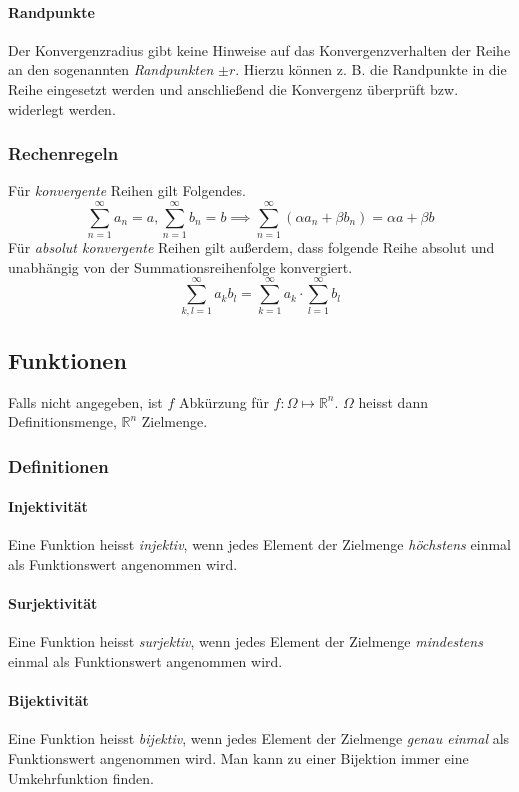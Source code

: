 \documentclass[a4paper, 9pt, DIV=24]{scrartcl}
\newcommand{\R}{\mathbb{R}}
\begin{document}
\paragraph{Randpunkte}
Der Konvergenzradius gibt keine Hinweise auf das Konvergenzverhalten der Reihe an den sogenannten \emph{Randpunkten} $\pm r$.
Hierzu können z. B. die Randpunkte in die Reihe eingesetzt werden und anschließend die Konvergenz überprüft bzw. widerlegt werden.

\subsubsection{Rechenregeln}
Für \emph{konvergente} Reihen gilt Folgendes.
\[
  \sum_{n=1}^\infty a_n = a, \sum_{n=1}^\infty b_n = b \implies
  \sum_{n=1}^\infty (\alpha a_n + \beta b_n) = \alpha a + \beta b
\]
Für \emph{absolut konvergente} Reihen gilt außerdem, dass folgende Reihe absolut und unabhängig von der Summationsreihenfolge konvergiert.
\[
  \sum_{k,l=1}^\infty a_k b_l = \sum_{k=1}^\infty a_k \cdot \sum_{l=1}^\infty b_l
\]

\subsection{Funktionen}
Falls nicht angegeben, ist $f$ Abkürzung für $f: \Omega \mapsto \R^n$. $\Omega$ heisst dann Definitionsmenge, $\R^n$ Zielmenge.
\subsubsection{Definitionen}
\paragraph{Injektivität}
Eine Funktion heisst \emph{injektiv}, wenn jedes Element der Zielmenge \emph{höchstens} einmal als Funktionswert angenommen wird.
\paragraph{Surjektivität}
Eine Funktion heisst \emph{surjektiv}, wenn jedes Element der Zielmenge \emph{mindestens} einmal als Funktionswert angenommen wird.
\paragraph{Bijektivität}
Eine Funktion heisst \emph{bijektiv}, wenn jedes Element der Zielmenge \emph{genau einmal} als Funktionswert angenommen wird. Man kann zu einer Bijektion immer eine Umkehrfunktion finden.
\end{document}
